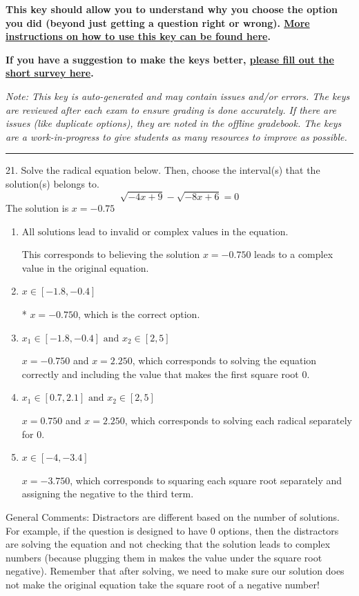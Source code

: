 \documentclass{article}[14pt]
\begin{document}
\textbf{This key should allow you to understand why you choose the option you did (beyond just getting a question right or wrong). \href{https://xronos.clas.ufl.edu/mac1105spring2020/courseDescriptionAndMisc/Exams/LearningFromResults}{More instructions on how to use this key can be found here}.}

\textbf{If you have a suggestion to make the keys better, \href{https://forms.gle/CZkbZmPbC9XALEE88}{please fill out the short survey here}.}

\textit{Note: This key is auto-generated and may contain issues and/or errors. The keys are reviewed after each exam to ensure grading is done accurately. If there are issues (like duplicate options), they are noted in the offline gradebook. The keys are a work-in-progress to give students as many resources to improve as possible.}

\rule{\textwidth}{0.4pt}

21. Solve the radical equation below. Then, choose the interval(s) that the solution(s) belongs to.
$$ \sqrt{-4 x + 9} - \sqrt{-8 x + 6} = 0 $$ 
The solution is $ x = -0.75 $ 

\begin{enumerate}[label=\Alph*.] 
\item $ \text{All solutions lead to invalid or complex values in the equation.} $ 

 This corresponds to believing the solution $x = -0.750$ leads to a complex value in the original equation. 
\item $ x \in [-1.8,-0.4] $ 

 * $x = -0.750$, which is the correct option. 
\item $ x_1 \in [-1.8, -0.4] \text{ and } x_2 \in [2,5] $ 

 $x = -0.750$ and $x = 2.250$, which corresponds to solving the equation correctly and including the value that makes the first square root 0. 
\item $ x_1 \in [0.7, 2.1] \text{ and } x_2 \in [2,5] $ 

 $x = 0.750$ and $x = 2.250$, which corresponds to solving each radical separately for 0. 
\item $ x \in [-4,-3.4] $ 

 $x = -3.750$, which corresponds to squaring each square root separately and assigning the negative to the third term. 
\end{enumerate} 
 
General Comments: Distractors are different based on the number of solutions. For example, if the question is designed to have 0 options, then the distractors are solving the equation and not checking that the solution leads to complex numbers (because plugging them in makes the value under the square root negative). Remember that after solving, we need to make sure our solution does not make the original equation take the square root of a negative number!
\end{document}
